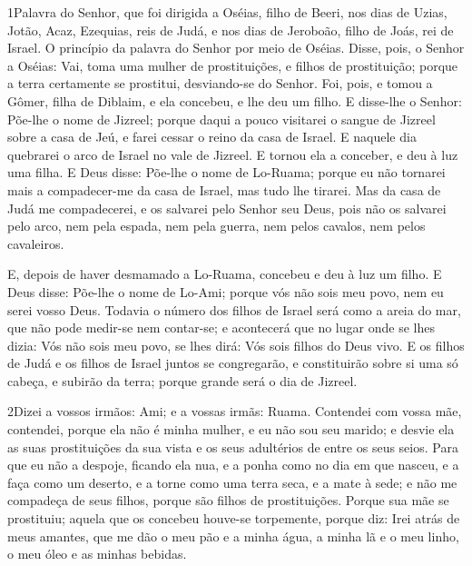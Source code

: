 
\lettrine{1} Palavra do Senhor, que foi dirigida a Oséias,
filho de Beeri, nos dias de Uzias, Jotão, Acaz, Ezequias, reis de
Judá, e nos dias de Jeroboão, filho de Joás, rei de Israel. O
princípio da palavra do Senhor por meio de Oséias. Disse, pois, o
Senhor a Oséias: Vai, toma uma mulher de prostituições, e filhos de
prostituição; porque a terra certamente se prostitui, desviando-se
do Senhor. Foi, pois, e tomou a Gômer, filha de Diblaim, e ela
concebeu, e lhe deu um filho. E disse-lhe o Senhor: Põe-lhe o
nome de Jizreel; porque daqui a pouco visitarei o sangue de Jizreel
sobre a casa de Jeú, e farei cessar o reino da casa de Israel. E
naquele dia quebrarei o arco de Israel no vale de Jizreel. E
tornou ela a conceber, e deu à luz uma filha. E Deus disse: Põe-lhe
o nome de Lo-Ruama; porque eu não tornarei mais a compadecer-me da
casa de Israel, mas tudo lhe tirarei. Mas da casa de Judá me
compadecerei, e os salvarei pelo Senhor seu Deus, pois não os
salvarei pelo arco, nem pela espada, nem pela guerra, nem pelos
cavalos, nem pelos cavaleiros.

E, depois de haver desmamado a Lo-Ruama, concebeu e deu à luz um
filho. E Deus disse: Põe-lhe o nome de Lo-Ami; porque vós não
sois meu povo, nem eu serei vosso Deus. Todavia o número dos
filhos de Israel será como a areia do mar, que não pode medir-se nem
contar-se; e acontecerá que no lugar onde se lhes dizia: Vós não
sois meu povo, se lhes dirá: Vós sois filhos do Deus vivo. E
os filhos de Judá e os filhos de Israel juntos se congregarão, e
constituirão sobre si uma só cabeça, e subirão da terra; porque
grande será o dia de Jizreel.

\medskip

\lettrine{2} Dizei a vossos irmãos: Ami; e a vossas irmãs:
Ruama. Contendei com vossa mãe, contendei, porque ela não é
minha mulher, e eu não sou seu marido; e desvie ela as suas
prostituições da sua vista e os seus adultérios de entre os seus
seios. Para que eu não a despoje, ficando ela nua, e a ponha
como no dia em que nasceu, e a faça como um deserto, e a torne como
uma terra seca, e a mate à sede; e não me compadeça de seus
filhos, porque são filhos de prostituições. Porque sua mãe se
prostituiu; aquela que os concebeu houve-se torpemente, porque diz:
Irei atrás de meus amantes, que me dão o meu pão e a minha água, a
minha lã e o meu linho, o meu óleo e as minhas bebidas.

